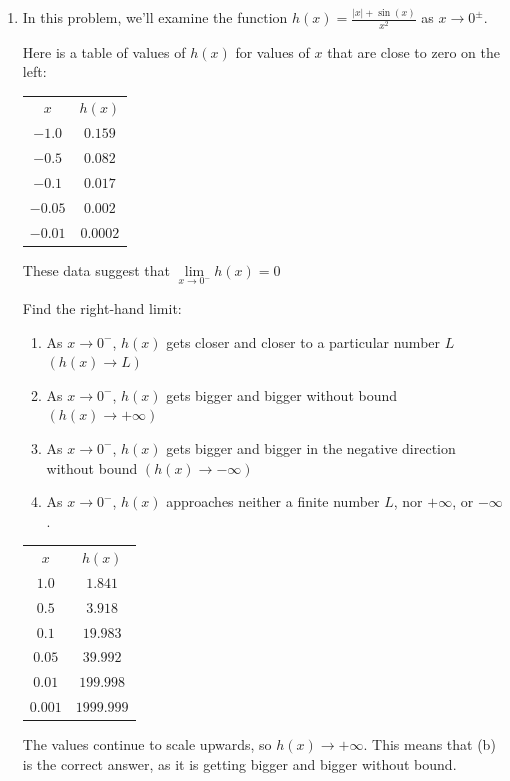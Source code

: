 \documentclass{article}
\begin{document}
\begin{enumerate}
\item In this problem, we'll examine the function $h(x) = \frac{|x| + \sin(x)}{x^{2}}$ as $x \rightarrow 0^{\pm}$.

Here is a table of values of $h(x)$ for values of $x$ that are close to zero on the left:
\begin{center}
    \begin{tabular} { c|c }
        $x$ & $h(x)$\\
        \cline{1-2}
        $-1.0$ & $0.159$\\
        $-0.5$ & $0.082$\\
        $-0.1$ & $0.017$\\
        $-0.05$ & $0.002$\\
        $-0.01$ & $0.0002$
    \end{tabular}
\end{center}
These data suggest that $\underset{x \rightarrow 0^{-}}{\lim} h(x) = 0$

Find the right-hand limit:
\begin{enumerate}
    \item As $x \rightarrow 0^{-}$, $h(x)$ gets closer and closer to a particular number $L$
        $\left(h(x) \rightarrow L\right)$
    \item As $x \rightarrow 0^{-}$, $h(x)$ gets bigger and bigger without bound
        $\left(h(x) \rightarrow +\infty\right)$
    \item As $x \rightarrow 0^{-}$, $h(x)$ gets bigger and bigger in the negative direction without bound
        $\left(h(x) \rightarrow -\infty\right)$
    \item As $x \rightarrow 0^{-}$, $h(x)$ approaches neither a finite number $L$, nor $+\infty$, or $-\infty$.
\end{enumerate}
\begin{center}
\begin{tabular} { c|c }
    $x$ & $h(x)$\\
    \cline{1-2}
    $1.0$ & $1.841$\\
    $0.5$ & $3.918$\\
    $0.1$ & $19.983$\\
    $0.05$ & $39.992$\\
    $0.01$ & $199.998$\\
    $0.001$ & $1999.999$
\end{tabular}
\end{center}
The values continue to scale upwards, so $h(x) \rightarrow +\infty$.
This means that (b) is the correct answer, as it is getting bigger and bigger without bound.


\end{enumerate}
\end{document}
